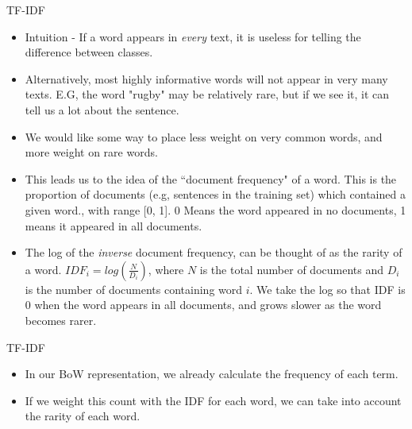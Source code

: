 \documentclass[aspectratio=169, 10pt]{beamer}
\begin{document}
\begin{frame}{TF-IDF}
    \begin{itemize}
        \item Intuition - If a word appears in \textit{every} text, it is useless for telling the difference between classes.
        \item Alternatively, most highly informative words will not appear in very many texts. E.G, the word "rugby" may be relatively rare, but if we see it, it can tell us a lot about the sentence.
        \item We would like some way to place less weight on very common words, and more weight on rare words.
        \item This leads us to the idea of the ``document frequency" of a word. This is the proportion of documents (e.g, sentences in the training set) which contained a given word., with range [0, 1]. 0 Means the word appeared in no documents, 1 means it appeared in all documents.
        \item The log of the \textit{inverse} document frequency, can be thought of as the rarity of a word. $IDF_i = log(\frac{N}{D_i})$, where $N$ is the total number of documents and $D_i$ is the number of documents containing word $i$. We take the log so that IDF is 0 when the word appears in all documents, and grows slower as the word becomes rarer.
    \end{itemize}
\end{frame}

\begin{frame}{TF-IDF}
    \begin{itemize}
        \item In our BoW representation, we already calculate the frequency of each term.
        \item If we weight this count with the IDF for each word, we can take into account the rarity of each word.
    \end{itemize}
\end{frame}
\end{document}
